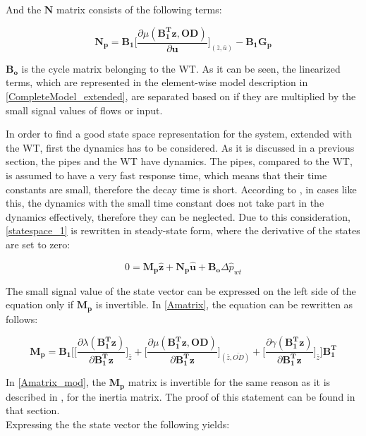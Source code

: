 And the $\bm{N}$ matrix consists of the following terms:

\begin{equation}
  \bm{N_p} = \bm{B_1} \bigg[ \frac{\partial{\mu(\bm{{B_1^{T}}}\bm{z}, \bm{OD})}}{{\partial{\bm{u}}}}  \bigg]_{(\bar{z}, \bar{u})} - \bm{B_1}\bm{G_p}  
\label{Bumatrix}
\end{equation}

$\bm{B_o}$ is the cycle matrix belonging to the WT. As it can be seen, the linearized terms, which are represented in the element-wise model description in \eqref{CompleteModel_extended}, are separated based on if they are multiplied by the small signal values of flows or input. 

In order to find a good state space representation for the system, extended with the WT, first the dynamics has to be considered. As it is discussed in a previous section, the pipes and the WT have dynamics. The pipes, compared to the WT, is assumed to have a very fast response time, which means that their time constants are small, therefore the decay time is short. According to \citep{franklin1994feedback}, in cases like this, the dynamics with the small time constant does not take part in the dynamics effectively, therefore they can be neglected. Due to this consideration, \eqref{statespace_1} is rewritten in steady-state form, where the derivative of the states are set to zero:

\begin{equation}
 0 = \bm{M_p} \bm{\hat{z}} + \bm{N_p} \bm{\hat{u}} + \bm{B_o} \Delta \hat{p}_{wt}    
 \label{statespace_2}
\end{equation}

The small signal value of the state vector can be expressed on the left side of the equation only if $\bm{M_p}$ is invertible. In \eqref{Amatrix}, the equation can be rewritten as follows: 

\begin{equation}
  \bm{M_p} = \bm{B_1}\Bigg[ \bigg[ \frac{\partial{\lambda(\bm{{B_1^{T}}}\bm{z})}}{{\partial{\bm{{B_1^{T}}}\bm{z}}}}   \bigg]_{\bar{z}} +
\bigg[ \frac{\partial{\mu(\bm{{B_1^{T}}}\bm{z}, \bm{OD})}}{{\partial{\bm{{B_1^{T}}}\bm{z}}}}  \bigg]_{(\bar{z}, \bar{OD})} +  \bigg[ \frac{\partial{\gamma(\bm{{B_1^{T}}}\bm{z})}}{{\partial{\bm{{B_1^{T}}}\bm{z}}}}   \bigg]_{\bar{z}}\Bigg] \bm{{B_1^{T}}}
\label{Amatrix_mod}
\end{equation}

In \eqref{Amatrix_mod}, the $\bm{M_p}$ matrix is invertible for the same reason as it is described in , for the inertia matrix. The proof of this statement can be found in that section. 
\\
Expressing the the state vector the following yields:

